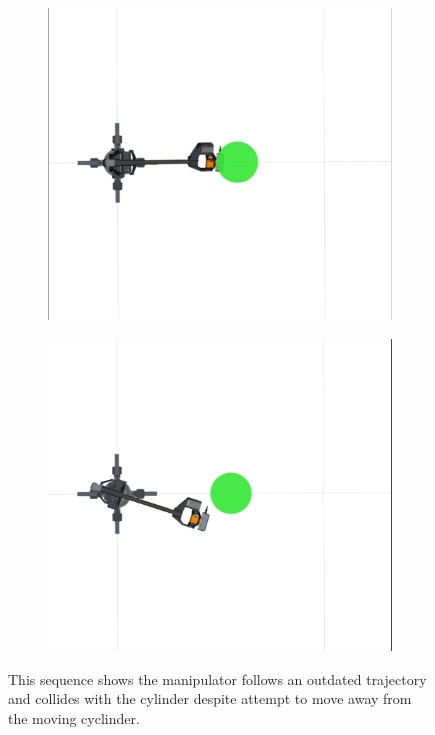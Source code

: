 \begin{figure}
\begin{subfigure}[b]{0.4\linewidth}
    \caption{}
  \end{subfigure}
  \begin{subfigure}[b]{0.4\linewidth}
    \includegraphics[width=\linewidth]{obs_avoidance_fail5.png}
    \caption{}
  \end{subfigure}
  \begin{subfigure}[b]{0.4\linewidth}
    \includegraphics[width=\linewidth]{obs_avoidance_fail6.png}
    \caption{}
  \end{subfigure}

  \caption{This sequence shows the manipulator follows an outdated trajectory and collides
  with the cylinder despite attempt to move away from the moving cyclinder.}
  \label{fig:obs_avoidance_fail}
\end{figure}
